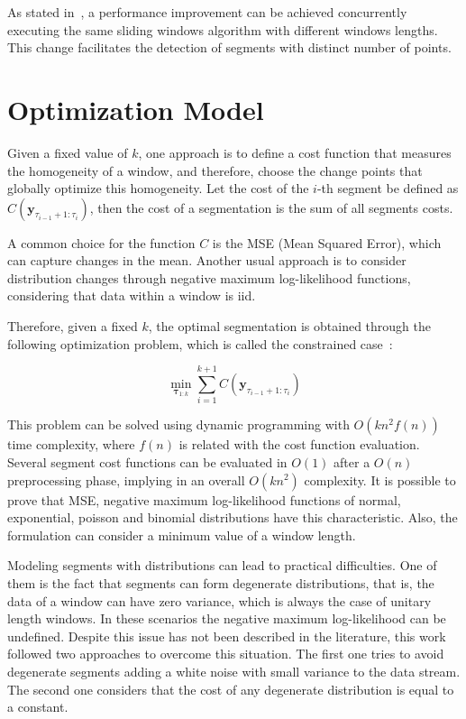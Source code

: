 As stated in~\cite{detecting_change_in_data_streams}, a performance improvement
can be achieved concurrently executing the same sliding windows algorithm with
different windows lengths. This change facilitates the detection of
segments with distinct number of points.

\section{Optimization Model}

Given a fixed value of $k$, one approach is to define a cost function that
measures the homogeneity of a window, and therefore, choose the change points
that globally optimize this homogeneity. Let the cost of the $i$-th segment be
defined as $C(\mathbf{y}_{\tau_{i - 1} + 1 : \tau_{i}})$, then the cost of a
segmentation is the sum of all segments costs.

A common choice for the function $C$ is the MSE (Mean Squared Error), which can
capture changes in the mean. Another usual approach is to consider distribution
changes through negative maximum log-likelihood functions, considering that data
within a window is iid.

Therefore, given a fixed $k$, the optimal segmentation is obtained through the
following optimization problem, which is called the constrained
case~\cite{on_optimal_multiple_changepoint_algorithms_for_large_data}:

\begin{equation}
    \min_{\boldsymbol \tau_{1 : k}} \sum \limits_{i = 1}^{k + 1} C(\mathbf{y}_{\tau_{i - 1} + 1 : \tau_{i}})
\end{equation}

This problem can be solved using dynamic programming with $O(k n^2 f(n))$ time
complexity, where $f(n)$ is related with the cost function evaluation. Several
segment cost functions can be evaluated in $O(1)$ after a $O(n)$ preprocessing
phase, implying in an overall $O(k n^2)$ complexity. It is possible to prove
that MSE, negative maximum log-likelihood functions of normal, exponential,
poisson and binomial distributions have this characteristic. Also, the
formulation can consider a minimum value of a window length.

Modeling segments with distributions can lead to practical difficulties. One of
them is the fact that segments can form degenerate distributions, that is, the
data of a window can have zero variance, which is always the case of unitary
length windows. In these scenarios the negative maximum log-likelihood can be
undefined. Despite this issue has not been described in the literature,
this work followed two approaches to overcome this situation. The first one
tries to avoid degenerate segments adding a white noise with small variance to
the data stream. The second one considers that the cost of any degenerate
distribution is equal to a constant.

